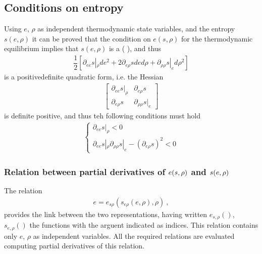\documentclass[letterpaper,10pt,english]{jupyterBook}
\begin{document}
\subsection{Conditions on entropy}
\label{\detokenize{ch/coefficients:conditions-on-entropy}}
\sphinxAtStartPar
Using \(e\), \(\rho\) as independent thermodynamic state variables, and the entropy \(s(e, \rho)\) it can be proved that the condition on \(e(s, \rho)\) for the thermodynamic equilibrium implies that \(s(e, \rho)\) is a  ( ), and thus
\begin{equation*}
\begin{split}\dfrac{1}{2} \left[ \partial_{ee} s|_{\rho} de^2 + 2 \partial_{e\rho} s de d\rho + \partial_{\rho \rho} s|_{e} d \rho^2 \right] \end{split}
\end{equation*}
\sphinxAtStartPar
is a positive\sphinxhyphen{}definite quadratic form, i.e. the Hessian
\begin{equation*}
\begin{split}\begin{bmatrix} \partial_{ee} s|_{\rho} & \partial_{e \rho} s \\ \partial_{e \rho } s & \partial_{\rho \rho} s|_{e} \end{bmatrix} \end{split}
\end{equation*}
\sphinxAtStartPar
is definite positive, and thus teh following conditions must hold
\begin{equation*}
\begin{split}\begin{cases}
  \partial_{ee} s|_{\rho} < 0 \\
  \partial_{ee} s|_{\rho} \partial_{\rho \rho} s|_{e} - \left( \partial_{e \rho} s \right)^2 < 0
\end{cases}\end{split}
\end{equation*}\subsubsection*{Relation between partial derivatives of \protect\(e(s,\rho)\protect\) and \protect\(s(e,\rho)\protect\)}

\sphinxAtStartPar
The relation
\begin{equation*}
\begin{split}e = e_{s \rho}(s_{e \rho}(e, \rho), \rho) \ ,\end{split}
\end{equation*}
\sphinxAtStartPar
provides the link between the two representations, having written \(e_{s,\rho}()\), \(s_{e,\rho}()\) the functions with the arguent indicated as indices. This relation contains only \(e\), \(\rho\) as independent variables. All the required relations are evaluated computing partial derivatives of this relation.
\end{document}
